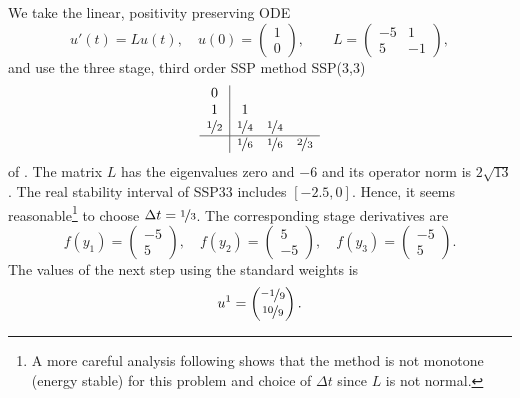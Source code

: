 \documentclass[a4paper]{article}
\numberwithin{equation}{section}
\theoremstyle{plain}
\theoremstyle{definition}
\numberwithin{theorem}{section}
\newcommand{\dt}{{\Delta t}}
\newcommand{\1}{\mathbbm{1}}
\begin{document}
We take the linear, positivity preserving ODE
\cite{kopecz_unconditionally_2018}
\begin{equation}
  u'(t) = L u(t),
  \quad
  u(0) = \begin{pmatrix} 1 \\ 0 \end{pmatrix},
  \qquad
  L = \begin{pmatrix} -5 & 1 \\ 5 & -1\end{pmatrix},
\end{equation}
and use the three stage, third order SSP method SSP(3,3)
\begin{align}
\begin{array}{c|ccc}
0 &  &  & \\
1 & 1 &  & \\
\nicefrac{1}{2} & \nicefrac{1}{4} & \nicefrac{1}{4} & \\
\hline
 & \nicefrac{1}{6} & \nicefrac{1}{6} & \nicefrac{2}{3}\\
\end{array}
\end{align}
of \cite{shu1988efficient}.
The matrix $L$ has the eigenvalues zero and $-6$ and its operator
norm is $2 \sqrt{13}$.
The real stability interval of SSP33 includes $[-2.5,0]$. Hence,
it seems reasonable\footnote{A more careful analysis following
\cite{ranocha2018L2stability} shows that the method is not
monotone (energy stable) for this problem and choice of $\dt$ since
$L$ is not normal.} to choose $\dt = \nicefrac{1}{3}$.
The corresponding stage derivatives are
\begin{equation}
  f(y_1) = \begin{pmatrix} -5 \\ 5 \end{pmatrix},\quad
  f(y_2) = \begin{pmatrix} 5 \\ -5 \end{pmatrix},\quad
  f(y_3) = \begin{pmatrix} -5 \\ 5 \end{pmatrix}.
\end{equation}
The values of the next step using the standard weights is
\begin{equation}
  u^1 = \begin{pmatrix} \nicefrac{-1}{9} \\ \nicefrac{10}{9} \end{pmatrix}.
\end{equation}
\end{document}
